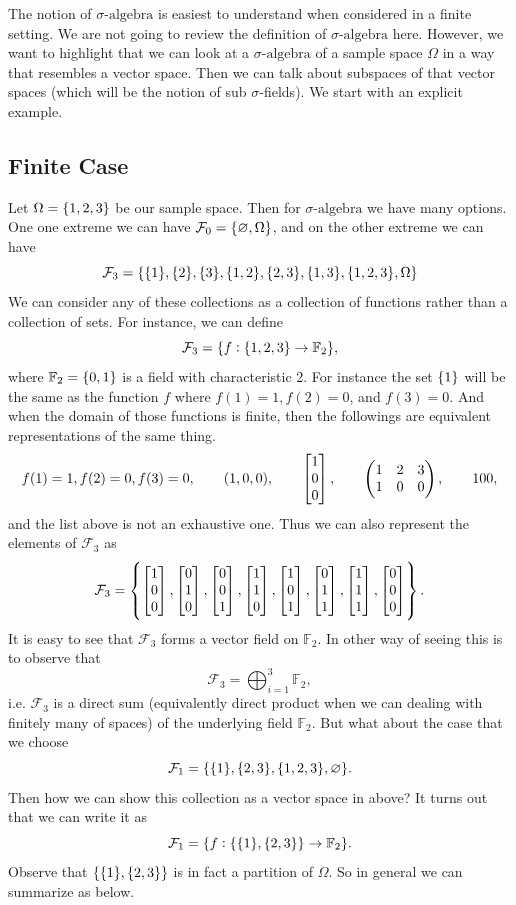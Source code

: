 \documentclass[11pt,a4paper]{article}
\theoremstyle{definition}
\theoremstyle{remark}
\begin{document}
	The notion of $\sigma\text{-algebra}$ is easiest to understand when considered in a finite setting. We are not going to review the definition of $\sigma\text{-algebra}$ here. However, we want to highlight that we can look at a $\sigma\text{-algebra}$ of a sample space $ \Omega $ in a way that resembles a vector space. Then we can talk about subspaces of that vector spaces (which will be the notion of sub $ \sigma $-fields). We start with an explicit example.
	
	\subsection{Finite Case}
	
	Let $ \Omega = \{1,2,3\} $ be our sample space. Then for $\sigma\text{-algebra}$ we have many options. One one extreme we can have $ \mathcal{F}_0 = \{\varnothing, \Omega\} $, and on the other extreme we can have 
	\[ \mathcal{F}_3 = \{\{1\},\{2\},\{3\},\{1,2\},\{2,3\},\{1,3\},\{1,2,3\}, \Omega\} \]
	We can consider any of these collections as a collection of functions rather than a collection of sets. For instance, we can define
	\[ \mathcal{F}_3 = \{f:\{1,2,3\}\to \mathbb{F}_2\}, \]
	where $ \mathbb{F}_2 = \{0,1\} $ is a field with characteristic 2. For instance the set $ \{1\} $ will be the same as the function $ f $ where $ f(1) = 1, f(2)=0$, and $f(3) = 0 $. And when the domain of those functions is finite, then the followings are equivalent representations of the same thing.
	\[ f(1)=1,f(2)=0,f(3)=0, \qquad (1,0,0), \qquad \begin{bmatrix} 1 \\ 0 \\ 0 \end{bmatrix}, \qquad \begin{pmatrix}
		1 & 2 & 3 \\
		1 & 0 & 0 
	\end{pmatrix}, \qquad 100,  \]
	and the list above is not an exhaustive one. Thus we can also represent the elements of $ \mathcal{F}_3 $ as 
	\[ \mathcal{F}_3 = \left\{\begin{bmatrix} 1 \\ 0 \\ 0 \end{bmatrix}, \begin{bmatrix} 0 \\ 1 \\ 0 \end{bmatrix}, \begin{bmatrix} 0 \\ 0 \\ 1 \end{bmatrix},\begin{bmatrix} 1 \\ 1 \\ 0 \end{bmatrix}, \begin{bmatrix} 1 \\ 0 \\ 1 \end{bmatrix}, \begin{bmatrix} 0 \\ 1 \\ 1 \end{bmatrix},\begin{bmatrix} 1 \\ 1 \\ 1 \end{bmatrix},\begin{bmatrix} 0 \\ 0 \\ 0 \end{bmatrix} \right\}. \]	
	It is easy to see that $ \mathcal{F}_3 $ forms a vector field on $ \mathbb{F}_2 $. In other way of seeing this is to observe that 
	\[ \mathcal{F}_3 = \bigoplus_{i=1}^3 \mathbb{F}_2, \]
	i.e. $ \mathcal{F}_3 $ is a direct sum (equivalently direct product when we can dealing with finitely many of spaces)  of the underlying field $ \mathbb{F}_2 $.
	But what about the case that we choose
	\[ \mathcal{F}_1 = \{\{1\},\{2,3\},\{1,2,3\},\varnothing\}. \]
	Then how we can show this collection as a vector space in above? It turns out that we can write it as
	\[ \mathcal{F}_1 = \{f: \{\{1\},\{2,3\}\} \to \mathbb{F}_2\}. \]
	Observe that $ \{\{1\},\{2,3\}\} $ is in fact a partition of $ \Omega $. So in general we can summarize as below.
	
\end{document}
